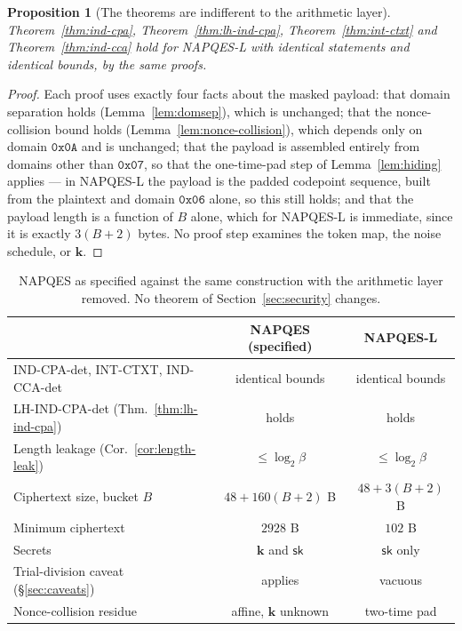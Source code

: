 \documentclass[11pt,a4paper]{article}
\newtheorem{proposition}[theorem]{Proposition}
\begin{document}
\begin{proposition}[The theorems are indifferent to the arithmetic layer]
\label{prop:lean-theorems}
Theorem~\ref{thm:ind-cpa}, Theorem~\ref{thm:lh-ind-cpa},
Theorem~\ref{thm:int-ctxt} and Theorem~\ref{thm:ind-cca} hold for NAPQES-L
with identical statements and identical bounds, by the same proofs.
\end{proposition}

\begin{proof}
Each proof uses exactly four facts about the masked payload: that domain
separation holds (Lemma~\ref{lem:domsep}), which is unchanged; that the
nonce-collision bound holds (Lemma~\ref{lem:nonce-collision}), which
depends only on domain $\texttt{0x0A}$ and is unchanged; that the payload
is assembled entirely from domains other than $\texttt{0x07}$, so that the
one-time-pad step of Lemma~\ref{lem:hiding} applies — in NAPQES-L the
payload is the padded codepoint sequence, built from the plaintext and
domain $\texttt{0x06}$ alone, so this still holds; and that the payload
length is a function of $B$ alone, which for NAPQES-L is immediate, since
it is exactly $3(B+2)$ bytes. No proof step examines the token map, the
noise schedule, or $\mathbf{k}$.
\end{proof}

\begin{table}[h]
\centering
\begin{tabular}{@{}lcc@{}}
\toprule
 & NAPQES (specified) & NAPQES-L \\
\midrule
IND-CPA-det, INT-CTXT, IND-CCA-det & identical bounds & identical bounds \\
LH-IND-CPA-det (Thm.~\ref{thm:lh-ind-cpa}) & holds & holds \\
Length leakage (Cor.~\ref{cor:length-leak}) & $\le\log_2\beta$ & $\le\log_2\beta$ \\
Ciphertext size, bucket $B$ & $48+160(B+2)$ B & $48+3(B+2)$ B \\
Minimum ciphertext & $2928$ B & $102$ B \\
Secrets & $\mathbf{k}$ and $\mathsf{sk}$ & $\mathsf{sk}$ only \\
Trial-division caveat (\S\ref{sec:caveats}) & applies & vacuous \\
Nonce-collision residue & affine, $\mathbf{k}$ unknown & two-time pad \\
\bottomrule
\end{tabular}
\caption{NAPQES as specified against the same construction with the
arithmetic layer removed. No theorem of Section~\ref{sec:security} changes.}
\label{tab:lean-comparison}
\end{table}
\end{document}
